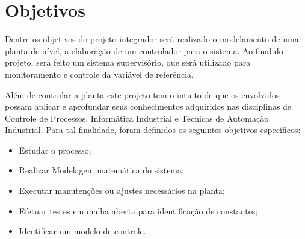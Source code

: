 \section{Objetivos}

\hspace{11mm}Dentre os objetivos do projeto integrador será realizado o modelamento de uma planta de nível, a elaboração de um controlador para o sistema. Ao final do projeto, será feito um sistema supervisório, que será utilizado para monitoramento e controle da variável de referência.

\hspace{11mm}Além de controlar a planta este projeto tem o intuito de que os envolvidos possam aplicar e aprofundar seus conhecimentos adquiridos nas disciplinas de Controle de Processos, Informática Industrial e Técnicas de Automação Industrial. Para tal finalidade, foram definidos os seguintes objetivos específicos:

    \begin{itemize}
        \item Estudar o processo;
        
        \item Realizar Modelagem matemática do sistema;
        
        \item Executar manutenções ou ajustes necessários na planta;
        
        \item Efetuar testes em malha aberta para identificação de constantes;
    
        \item Identificar um modelo de controle.
        
    \end{itemize}